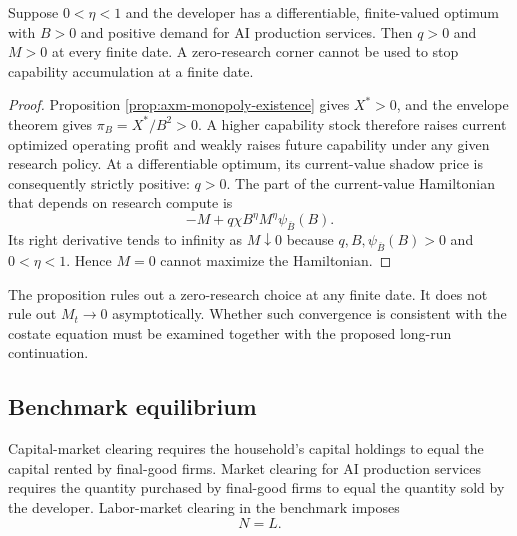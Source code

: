 \begin{proposition}
\label{prop:axm-no-zero-research-corner}
Suppose \(0<\eta<1\) and the developer has a differentiable, finite-valued
optimum with \(B>0\) and positive demand for AI production services. Then
\(q>0\) and \(M>0\) at every finite date. A zero-research corner cannot be used
to stop capability accumulation at a finite date.
\end{proposition}

\begin{proof}
Proposition \ref{prop:axm-monopoly-existence} gives \(X^*>0\), and the envelope
theorem gives \(\pi_B=X^*/B^2>0\). A higher capability stock therefore raises
current optimized operating profit and weakly raises future capability under
any given research policy. At a differentiable optimum, its current-value
shadow price is consequently strictly positive: \(q>0\). The part of the
current-value Hamiltonian that depends on research compute is
\[
 -M+q\chi B^\eta M^\eta\psi_{\overline B}(B).
\]
 Its right derivative tends to infinity as \(M\downarrow0\) because
 \(q,B,\psi_{\overline B}(B)>0\) and \(0<\eta<1\). Hence \(M=0\) cannot
 maximize the Hamiltonian.
\end{proof}

The proposition rules out a zero-research choice at any finite date. It does
not rule out \(M_t\to0\) asymptotically. Whether such convergence is consistent
with the costate equation must be examined together with the proposed
long-run continuation.

\subsection{Benchmark equilibrium}

Capital-market clearing requires the household's capital holdings to equal the
capital rented by final-good firms. Market clearing for AI production services
requires the quantity purchased by final-good firms to equal the quantity sold
by the developer. Labor-market clearing in the benchmark imposes
\begin{equation}
 N=L.
 \label{eq:axm-labor-market-benchmark}
\end{equation}

